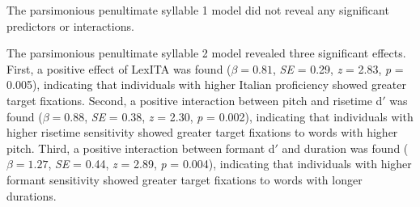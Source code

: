 {The parsimonious penultimate syllable 1 model did not reveal any significant predictors or interactions.

The parsimonious penultimate syllable 2 model revealed three significant effects. First, a positive effect of LexITA was found ($\beta = 0.81$, \textit{SE} = 0.29, \textit{z} = 2.83, \textit{p} = 0.005), indicating that individuals with higher Italian proficiency showed greater target fixations. Second, a positive interaction between pitch and risetime d$'$ was found ($\beta = 0.88$, \textit{SE} = 0.38, \textit{z} = 2.30, \textit{p} = 0.002), indicating that individuals with higher risetime sensitivity showed greater target fixations to words with higher pitch. Third, a positive interaction between formant d$'$ and duration was found ($\beta = 1.27$, \textit{SE} = 0.44, \textit{z} = 2.89, \textit{p} = 0.004), indicating that individuals with higher formant sensitivity showed greater target fixations to words with longer durations.}


